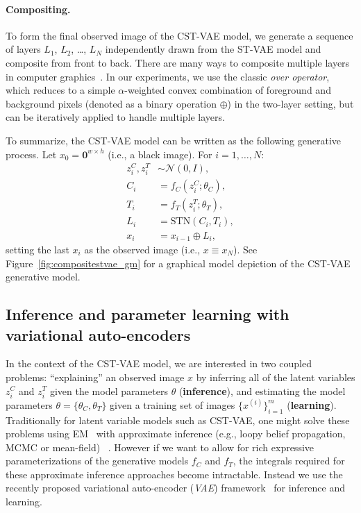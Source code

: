 \paragraph{Compositing.}
To form the final observed image of the CST-VAE model, we generate a sequence of layers $L_1$, $L_2$, \dots, $L_N$
independently drawn from the ST-VAE model and composite from front to back.
There are many  ways to composite multiple layers in computer graphics~\citep{porter1984compositing}.
In our experiments, we use  the classic \emph{over operator}, which reduces to a simple $\alpha$-weighted
convex combination of foreground and background pixels (denoted as a  binary  operation $\oplus$)
in the two-layer setting, but can be iteratively applied
to handle multiple layers. %

 

To summarize, the CST-VAE model can be written as the following generative process.  Let $x_0=\mathbf{0}^{w\times h}$ (i.e., a black image).   For $i=1,\dots,N$:
\begin{align*}
z_i^C, z_i^T  &\sim \mathcal{N}(0, I), \\
C_i &= f_C(z_i^C; \theta_C), \\
T_i &= f_T(z_i^T; \theta_T), \\
L_i &= \mbox{STN}(C_i, T_i), \\
x_i &= x_{i-1} \oplus L_i,
\end{align*}
setting the last $x_i$ as the observed image (i.e., $x\equiv x_N$). 
See Figure~\ref{fig:compositestvae_gm} for
 a graphical model depiction of the CST-VAE generative model.




\subsection{Inference and parameter learning with variational auto-encoders}

In the context of the CST-VAE model, we are  interested in two coupled problems:
``explaining'' an observed image $x$ by inferring all of the latent variables $z^C_i$ and $z^T_i$ given the model parameters $\theta$  (\textbf{inference}), and 
 estimating the model parameters $\theta=\{\theta_C,\theta_T\}$ given a training set of images $\{x^{(i)}\}_{i=1}^m$ (\textbf{learning}).  
Traditionally for  latent variable models such as CST-VAE,  one might solve these problems using EM~\citep{dempster1977maximum}
with approximate inference (e.g., loopy belief propagation, MCMC or mean-field) ~\citep{wainwright2008graphical}. 
However if we want to allow for rich expressive parameterizations of the generative models $f_C$ and $f_T$, the integrals required
for these approximate inference approaches become intractable.  Instead we use the recently proposed 
variational auto-encoder (\emph{VAE}) framework~\citep{Kingma2014} for inference and learning.


